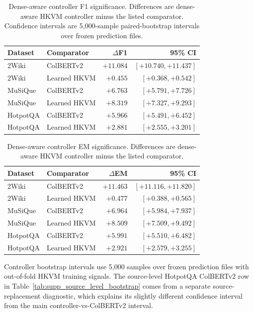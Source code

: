 \documentclass[conference]{IEEEtran}
\begin{document}
\begin{table}[t]
\caption{Dense-aware controller F1 significance. Differences are dense-aware HKVM controller minus the listed comparator. Confidence intervals are 5,000-sample paired-bootstrap intervals over frozen prediction files.}
\label{tab:supp_controller_f1_bootstrap}
\centering
\scriptsize
\begin{tabular}{llrr}
\toprule
Dataset & Comparator & $\Delta$F1 & 95\% CI \\
\midrule
2Wiki & ColBERTv2 & $+11.084$ & $[+10.740,+11.437]$ \\
2Wiki & Learned HKVM & $+0.455$ & $[+0.368,+0.542]$ \\
MuSiQue & ColBERTv2 & $+6.763$ & $[+5.791,+7.726]$ \\
MuSiQue & Learned HKVM & $+8.319$ & $[+7.327,+9.293]$ \\
HotpotQA & ColBERTv2 & $+5.966$ & $[+5.491,+6.452]$ \\
HotpotQA & Learned HKVM & $+2.881$ & $[+2.555,+3.201]$ \\
\bottomrule
\end{tabular}
\end{table}

\begin{table}[t]
\caption{Dense-aware controller EM significance. Differences are dense-aware HKVM controller minus the listed comparator.}
\label{tab:supp_controller_em_bootstrap}
\centering
\scriptsize
\begin{tabular}{llrr}
\toprule
Dataset & Comparator & $\Delta$EM & 95\% CI \\
\midrule
2Wiki & ColBERTv2 & $+11.463$ & $[+11.116,+11.820]$ \\
2Wiki & Learned HKVM & $+0.477$ & $[+0.388,+0.565]$ \\
MuSiQue & ColBERTv2 & $+6.964$ & $[+5.984,+7.937]$ \\
MuSiQue & Learned HKVM & $+8.509$ & $[+7.509,+9.492]$ \\
HotpotQA & ColBERTv2 & $+5.991$ & $[+5.510,+6.482]$ \\
HotpotQA & Learned HKVM & $+2.921$ & $[+2.579,+3.255]$ \\
\bottomrule
\end{tabular}
\end{table}

Controller bootstrap intervals use 5,000 samples over frozen prediction files with out-of-fold HKVM training signals. The source-level HotpotQA ColBERTv2 row in Table~\ref{tab:supp_source_level_bootstrap} comes from a separate source-replacement diagnostic, which explains its slightly different confidence interval from the main controller-vs-ColBERTv2 interval.
\end{document}
